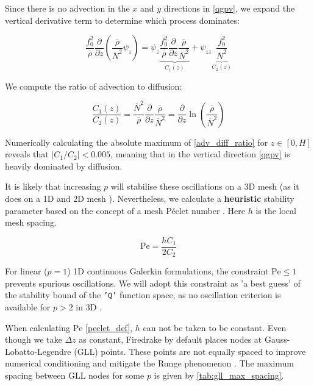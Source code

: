 \documentclass{article}
\begin{document}
Since there is no advection in the $x$ and $y$ directions in \cref{qgpv}, we expand the vertical derivative term to determine which process dominates:

\begin{equation}\label{advection_order}
    \frac{f_0^2}{\overline{\rho}}\frac{\partial}{\partial z} \left( \frac{\overline{\rho}}{\overline{N}^2}  \psi_z\right) = \psi_z \underbrace{\frac{f_0^2}{\overline{\rho}}\frac{\partial}{\partial z}\frac{\overline{\rho}}{\overline{N}^2}}_{C_1(z)} + \psi_{zz} \underbrace{\frac{f_0^2}{\overline{N}^2}}_{C_2(z)}
\end{equation}

We compute the ratio of advection to diffusion:

\begin{equation}\label{adv_diff_ratio}
     \frac{C_1(z)}{C_2(z)} = \frac{\overline{N}^2}{\overline{\rho}}\frac{\partial}{\partial z}\frac{\overline{\rho}}{\overline{N}^2} = \frac{\partial}{\partial z} \ln \left( \frac{\overline{\rho}}{\overline{N}^2}\right)
\end{equation}

Numerically calculating the absolute maximum of \cref{adv_diff_ratio} for $z \in [0, H]$ reveals that $|C_1/C_2| < 0.005$, meaning that in the vertical direction \cref{qgpv} is heavily dominated by diffusion. 

It is likely that increasing $p$ will stabilise these oscillations on a 3D mesh (as it does on a 1D and 2D mesh \cite{CAI2014}).
Nevertheless, we calculate a \textbf{heuristic} stability parameter based on the concept of a mesh Péclet number \cite{Donea2003}. Here $h$ is the local mesh spacing.

\begin{equation}\label{peclet_def}
    \mathrm{Pe}= \frac{hC_1}{2C_2}
\end{equation}

For linear ($p=1$) 1D continuous Galerkin formulations, the constraint $\mathrm{Pe} \le 1$ prevents spurious oscillations.
We will adopt this constraint as 'a best guess' of the stability bound of the \texttt{'Q'} function space, as no oscillation criterion is available for $p>2$ in 3D \cite{Donea2003}.

When calculating $\mathrm{Pe}$ \eqref{peclet_def}, $h$ can not be taken to be constant.
Even though we take $\Delta z$ as constant, Firedrake by default places nodes at Gauss-Lobatto-Legendre (GLL) points.
These points are not equally spaced to improve numerical conditioning \cite{FiredrakeUserManual} and mitigate the Runge phenomenon \cite{Trefethen2000}.
The maximum spacing between GLL nodes for some $p$ is given by \cref{tab:gll_max_spacing}.
\end{document}
